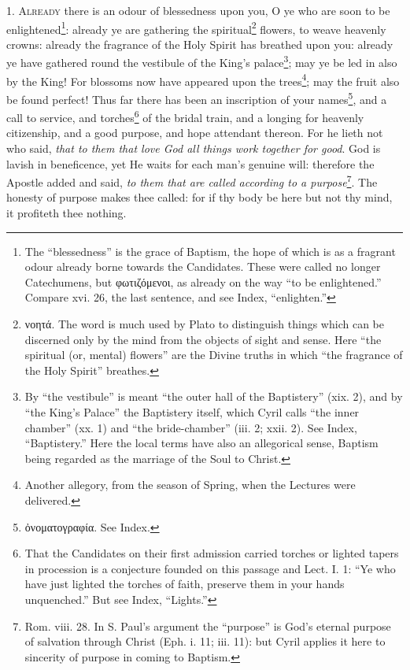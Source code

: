 
1. \textsc{Already} there is an odour of blessedness upon you, O ye who are soon to be enlightened\footnote{The “blessedness” is the grace of Baptism, the hope of which is as a fragrant odour already borne towards the Candidates. These were called no longer Catechumens, but \textgreek{φωτιζόμενοι}, as already on the way “to be enlightened.” Compare xvi. 26, the last sentence, and see Index, “enlighten.”}: already ye are gathering the spiritual\footnote{\textgreek{νοητά}. The word is much used by Plato to distinguish things which can be discerned only by the mind from the objects of sight and sense. Here “the spiritual (or, mental) flowers” are the Divine truths in which “the fragrance of the Holy Spirit” breathes.} flowers, to weave heavenly crowns: already the fragrance of the Holy Spirit has breathed upon you: already ye have gathered round the vestibule of the King’s palace\footnote{By “the vestibule” is meant “the outer hall of the Baptistery” (xix. 2), and by “the King’s Palace” the Baptistery itself, which Cyril calls “the inner chamber” (xx. 1) and “the bride-chamber” (iii. 2; xxii. 2). See Index, “Baptistery.” Here the local terms have also an allegorical sense, Baptism being regarded as the marriage of the Soul to Christ.}; may ye be led in also by the King! For blossoms now have appeared upon the trees\footnote{Another allegory, from the season of Spring, when the Lectures were delivered.}; may the fruit also be found perfect! Thus far there has been an inscription of your names\footnote{\textgreek{ὀνοματογραφία}. See Index.}, and a call to service, and torches\footnote{That the Candidates on their first admission carried torches or lighted tapers in procession is a conjecture founded on this passage and Lect. I. 1: “Ye who have just lighted the torches of faith, preserve them in your hands unquenched.” But see Index, “Lights.”} of the bridal train, and a longing for heavenly citizenship, and a good purpose, and hope attendant thereon. For he lieth not who said, \emph{that to them that love God all things work together for good}. God is lavish in beneficence, yet He waits for each man’s genuine will: therefore the Apostle added and said, \emph{to them that are called according to a purpose}\footnote{Rom. viii. 28. In S. Paul’s argument the “purpose” is God’s eternal purpose of salvation through Christ (Eph. i. 11; iii. 11): but Cyril applies it here to sincerity of purpose in coming to Baptism.}. The honesty of purpose makes thee called: for if thy body be here but not thy mind, it profiteth thee nothing.

